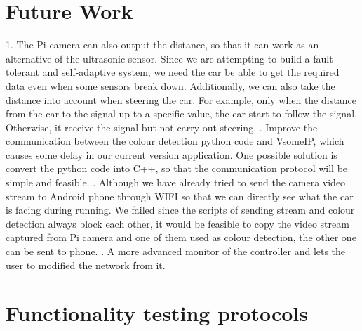 \documentclass[11pt, titlepage]{article} %
\begin{document}
\section{Future Work}
1.	The Pi camera can also output the distance, so that it can work as an alternative of the ultrasonic sensor. Since we are attempting to build a fault tolerant and self-adaptive system, we need the car be able to get the required data even when some sensors break down. Additionally, we can also take the distance into account when steering the car. For example, only when the distance from the car to the signal up to a specific value, the car start to follow the signal. Otherwise, it receive the signal but not carry out steering.
.	Improve the communication between the colour detection python code and VsomeIP, which causes some delay in our current version application. One possible solution is convert the python code into C++, so that the communication protocol will be simple and feasible.
.	Although we have already tried to send the camera video stream to Android phone through WIFI so that we can directly see what the car is facing during running. We failed since the scripts of sending stream and colour detection always block each other, it would be feasible to copy the video stream captured from Pi camera and one of them used as colour detection, the other one can be sent to phone.
. A more advanced monitor of the controller and lets the user to modified the network from it. 
\clearpage




\clearpage
\clearpage
\appendix

\section{Functionality testing protocols}
\label{appendix:functionalityTesting}
\end{document}

